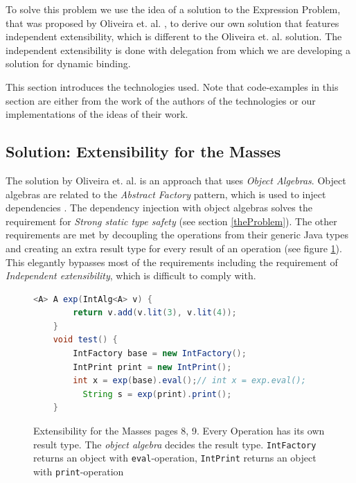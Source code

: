 \documentclass{report}
\begin{document}
To solve this problem we use the idea of a solution to the Expression Problem, that was proposed by Oliveira et. al. \cite{Oliv-Extensibility-2012}, to derive our own solution that features independent extensibility, which is different to the Oliveira et. al. solution. The independent extensibility is done with delegation from which we are developing a solution for dynamic binding.

This section introduces the technologies used. Note that code-examples in this section are either from the work of the authors of the technologies or our implementations of the ideas of their work.


\subsection{Solution: Extensibility for the Masses}

The solution by Oliveira et. al. \cite{Oliv-Extensibility-2012} is an approach that uses \emph{Object Algebras}. Object algebras are related to the \emph{Abstract Factory} pattern, which is used to inject dependencies \cite{Gof-Design-1993}. The dependency injection with object algebras solves the requirement for \emph{Strong static type safety} (see section \ref{theProblem}). The other requirements are met by decoupling the operations from their generic Java types and creating an extra result type for every result of an operation (see figure \ref{differentAlgebras}). This elegantly bypasses most of the requirements including the requirement of \emph{Independent extensibility}, which is difficult to comply with.

\begin{figure}[h]
\begin{lstlisting}[language=java]
    <A> A exp(IntAlg<A> v) {
        return v.add(v.lit(3), v.lit(4));
    }
    void test() {
        IntFactory base = new IntFactory();
        IntPrint print = new IntPrint();
        int x = exp(base).eval();// int x = exp.eval();
￼￼        String s = exp(print).print();
    }
\end{lstlisting}
\caption{Extensibility for the Masses \cite{Oliv-Extensibility-2012} pages 8, 9. Every Operation has its own result type. The \emph{object algebra} decides the result type. \lstinline{IntFactory} returns an object with \lstinline{eval}-operation, \lstinline{IntPrint} returns an object with \lstinline{print}-operation}
\label{differentAlgebras}
\end{figure}
\end{document}
